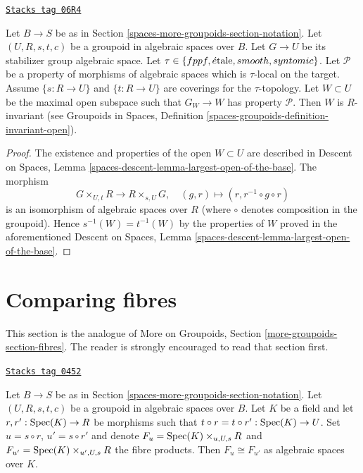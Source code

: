 \begin{lemma}
\label{spaces-more-groupoids-lemma-property-G-invariant}
\href{https://stacks.math.columbia.edu/tag/06R4}{\texttt{Stacks tag 06R4}}

Let $B \to S$ be as in Section \ref{spaces-more-groupoids-section-notation}.
Let $(U, R, s, t, c)$ be a groupoid in algebraic spaces over $B$.
Let $G \to U$ be its stabilizer group algebraic space.
Let
$\tau \in \{fppf, \linebreak[0] \etale, \linebreak[0]
smooth, \linebreak[0] syntomic\}$.
Let $\mathcal{P}$ be a property of morphisms of algebraic spaces
which is $\tau$-local on the target.
Assume $\{s : R \to U\}$ and $\{t : R \to U\}$ are coverings for the
$\tau$-topology. Let $W \subset U$ be the maximal open subspace such that
$G_W \to W$ has property $\mathcal{P}$.
Then $W$ is $R$-invariant (see
Groupoids in Spaces,
Definition \ref{spaces-groupoids-definition-invariant-open}).
\end{lemma}

\begin{proof}
The existence and properties of the open $W \subset U$ are described in
Descent on Spaces, Lemma \ref{spaces-descent-lemma-largest-open-of-the-base}.
The morphism
$$
G \times_{U, t} R \longrightarrow R \times_{s, U} G, \quad
(g, r) \longmapsto (r, r^{-1} \circ g \circ r)
$$
is an isomorphism of algebraic spaces over $R$ (where $\circ$ denotes
composition in the groupoid). Hence $s^{-1}(W) = t^{-1}(W)$ by the
properties of $W$ proved in the aforementioned
Descent on Spaces, Lemma \ref{spaces-descent-lemma-largest-open-of-the-base}.
\end{proof}

\section{Comparing fibres}
\label{spaces-more-groupoids-section-fibres}
This section is the analogue of
More on Groupoids, Section \ref{more-groupoids-section-fibres}.
The reader is strongly encouraged to read that section first.

\begin{lemma}
\label{spaces-more-groupoids-lemma-two-fibres}
\href{https://stacks.math.columbia.edu/tag/0452}{\texttt{Stacks tag 0452}}

Let $B \to S$ be as in Section \ref{spaces-more-groupoids-section-notation}.
Let $(U, R, s, t, c)$ be a groupoid in algebraic spaces over $B$.
Let $K$ be a field and let $r, r' : \operatorname{Spec}(K) \to R$
be morphisms such that $t \circ r = t \circ r' : \operatorname{Spec}(K) \to U$.
Set $u = s \circ r$, $u' = s \circ r'$ and denote
$F_u = \operatorname{Spec}(K) \times_{u, U, s} R$ and
$F_{u'} = \operatorname{Spec}(K) \times_{u', U, s} R$ the fibre products.
Then $F_u \cong F_{u'}$ as algebraic spaces over $K$.
\end{lemma}

